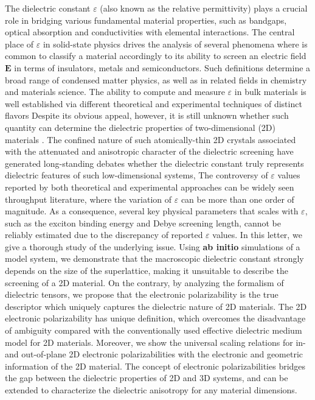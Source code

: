 \documentclass[journal=ancac3,manuscript=article,email=true,hyperref=true,keywords=false]{achemso}
\begin{document}
The dielectric constant $\varepsilon$ (also known as the relative permittivity) 
plays a crucial role in bridging various fundamental material
properties, such as bandgaps\cite{Moss_1950_relation,Moss_1985_n_Eg}, 
optical absorption\cite{kittel_2005_introduction} and 
conductivities\cite{Dressel_2001_electrodynamics}   
with elemental interactions. 
The central place of $\varepsilon$ in solid-state physics drives the analysis of several phenomena 
where is common to classify a material accordingly to its ability to screen an 
electric field $\boldsymbol{E}$ in terms of insulators, metals and semiconductors. Such definitions determine a broad range of 
condensed matter physics, as well as in related fields in chemistry and materials science. 
The ability to compute and measure $\varepsilon$ in bulk materials is well established via different 
theoretical \cite{Adler_1962,Hybertsen_1987} and experimental techniques \cite{palik_1998handbook} of distinct flavors
%
Despite its obvious appeal, however, it is still unknown whether such quantity can determine the 
dielectric properties of two-dimensional (2D) materials \cite{Novoselov_2016}.  
%
The confined nature of such atomically-thin 2D crystals associated
with the attenuated and anisotropic character of the dielectric
screening
\cite{Keldysh_1979_eps_multi,Sharma_1985,Low_2014_screening_BP,Cudazzo_2011_screening_2D,Bechstedt_2012,Cudazzo_2010_screen2D,Nazarov_2015_2D_3D}
have generated long-standing debates whether the dielectric constant
truly represents dielectric features of such low-dimensional systems,
The controversy of
$\varepsilon$ values reported by both theoretical and experimental
approaches can be widely seen throughput literature\cite{Li_2016},
where the variation of $\varepsilon$ can be more than one order of
magnitude. As a consequence, several key physical parameters that
scales with $\varepsilon$, such as the exciton binding energy and
Debye screening length, cannot be reliably estimated due to the
discrepancy of reported $\varepsilon$ values. In this letter, we give
a thorough study of the underlying issue. Using \textbf{ab initio}
simulations of a model system, we demonstrate that the macroscopic
dielectric constant strongly depends on the size of the superlattice,
making it unsuitable to describe the screening of a 2D material. On
the contrary, by analyzing the formalism of dielectric tensors, we
propose that the electronic polarizability is the true descriptor
which uniquely captures the dielectric nature of 2D materials. The 2D
electronic polarizability has unique definition, which overcomes the
disadvantage of ambiguity compared with the conventionally used
effective dielectric medium model for 2D materials. Moreover, we show
the universal scaling relations for in- and out-of-plane 2D electronic
polarizabilities with the electronic and geometric information of the
2D material. The concept of electronic polarizabilities bridges the
gap between the dielectric properties of 2D and 3D systems, and can be
extended to characterize the dielectric anisotropy for any material
dimensions.
\end{document}
